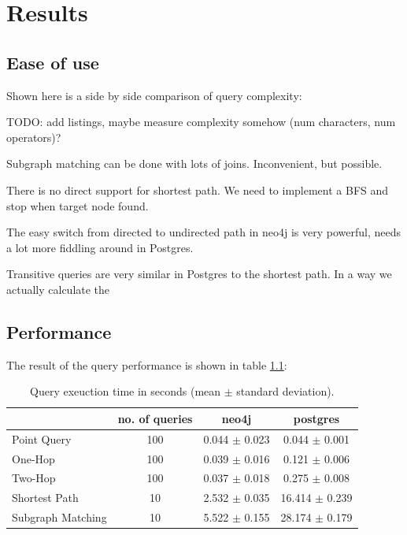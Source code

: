 \documentclass[11pt, a4paper,oneside,chapterprefix=false]{scrbook}
\begin{document}
\chapter{Results} \label{chp:results}


\section{Ease of use} \label{sec:convenience}

Shown here is a side by side comparison of query complexity:

TODO: add listings, maybe measure complexity somehow (num characters, num operators)?

Subgraph matching can be done with lots of joins.
Inconvenient, but possible.

There is no direct support for shortest path. 
We need to implement a BFS and stop when target node found.

The easy switch from directed to undirected path in neo4j is very powerful, needs a lot more fiddling around in Postgres.

Transitive queries are very similar in Postgres to the shortest path. In a way we actually calculate the 

\section{Performance} \label{sec:performance}

The result of the query performance is shown in table \ref{table:performance}:

\begin{table}
	\begin{center}
		\begin{tabular}{ |l|c|c|c| }
			\hline
			& no. of queries & neo4j & postgres \\
			\hline
			Point Query & 100 & 0.044 $\pm$ 0.023 & 0.044 $\pm$ 0.001 \\
			One-Hop & 100 & 0.039 $\pm$ 0.016 & 0.121 $\pm$ 0.006 \\
			Two-Hop & 100 & 0.037 $\pm$ 0.018 & 0.275 $\pm$ 0.008 \\
			Shortest Path & 10 & 2.532 $\pm$ 0.035 & 16.414 $\pm$ 0.239 \\
			Subgraph Matching & 10 & 5.522 $\pm$ 0.155 & 28.174 $\pm$ 0.179 \\
			\hline
		\end{tabular}
		\caption{\label{table:performance} Query exeuction time in seconds (mean $\pm$ standard deviation).}
	\end{center}
\end{table}
\end{document}
